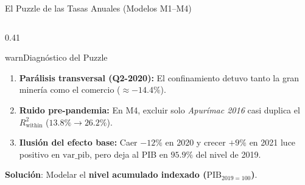 \begin{frame}{El Puzzle de las Tasas Anuales (Modelos M1--M4)}
\begin{columns}[T,onlytextwidth]
\begin{column}{0.41\textwidth}
\begin{contrastbox}{warn}{Diagnóstico del Puzzle}
\scriptsize\RaggedRight
\begin{enumerate}\setlength{\itemsep}{0.10em}
  \item \textbf{Parálisis transversal (Q2-2020):} El confinamiento detuvo tanto la gran minería como el comercio ($\approx -14.4\%$).
  \item \textbf{Ruido pre-pandemia:} En M4, excluir solo \textit{Apurímac 2016} casi duplica el $R^2_{\text{within}}$ ($13.8\% \rightarrow 26.2\%$).
  \item \textbf{Ilusión del efecto base:} Caer $-12\%$ en 2020 y crecer $+9\%$ en 2021 luce positivo en $\text{var\_pib}$, pero deja al PIB en $95.9\%$ del nivel de 2019.
\end{enumerate}
\end{contrastbox}
\vspace{0.04cm}
\begin{keybox}[left=2mm,right=2mm,top=0.8mm,bottom=0.8mm]
\scriptsize\RaggedRight \textbf{Solución}: Modelar el \textbf{nivel acumulado indexado ($\text{PIB}_{2019=100}$)}.
\end{keybox}
\end{column}
\end{columns}
\end{frame}

